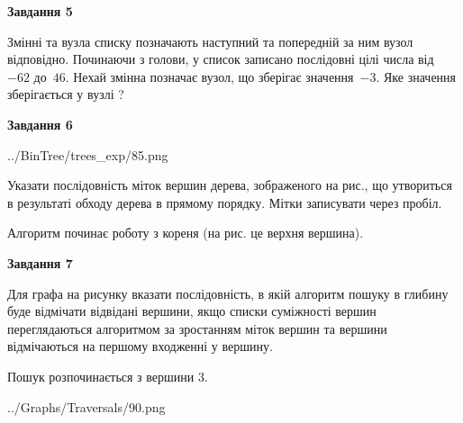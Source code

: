 \documentclass[12pt, ukrainian]{article}
\begin{document}
{\begin {large}
{\begin {center}\textbf{Завдання 5}\end {center}}\par
Змінні  та  вузла списку позначають наступний та попередній за ним вузол відповідно. Починаючи з голови, у список записано послідовні цілі числа від~$-62$ до~$46$. Нехай змінна  позначає вузол, що зберігає значення~$-3$.
Яке значення зберігається у вузлі  ?\par
\newpage

{\begin {center}\textbf{Завдання 6}\end {center}}\par

\begin{center}
	{../BinTree/trees_exp/85.png}
\end{center}
Указати послідовність міток вершин дерева, зображеного на рис., що утвориться в результаті обходу дерева в прямому порядку. Мітки записувати через пробіл.\par Алгоритм починає роботу з кореня (на рис. це верхня вершина).\par
\newpage

{\begin {center}\textbf{Завдання 7}\end {center}}\par
Для графа на рисунку вказати послідовність, в якій алгоритм пошуку в глибину буде відмічати відвідані вершини, якщо списки суміжності вершин переглядаються алгоритмом за зростанням міток вершин та вершини відмічаються на першому вход\-женні у вершину.\par
Пошук розпочинається з вершини 3.\par

\begin{center}
	{../Graphs/Traversals/90.png}
\end{center}\par
\newpage


\end{large}}
\end{document}
